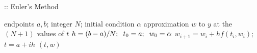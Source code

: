 \documentclass[12pt,oneside]{book}
\begin{document}
\begin{spacing}{1.2}
				\begin{algorithm}
					\caption{:: Euler's Method}
					\begin{algorithmic}[1]
						\REQUIRE endpoints $ a, b $; \hspace*{0.2cm} integer $ N $; \hspace*{0.2cm} initial condition $ \alpha $
						\ENSURE approximation $ w $ to $ y $ at the $ (N + 1) $ values of $ t $
						\STATE $ h = (b - a) / N; \hspace*{0.2cm} t_0 = a; \hspace*{0.2cm} w_{0} = \alpha $
							\STATE $ w_{i+1} = w_{i} + hf(t_{i},w_{i}); $ \hspace*{0.5cm} 
							\STATE $ t = a + ih $ \hspace*{0.5cm} 
						\ENDFOR
						\RETURN $ (t, w) $
					\end{algorithmic}
				\end{algorithm}
			
		\end{spacing}

	\clearpage
\end{document}
